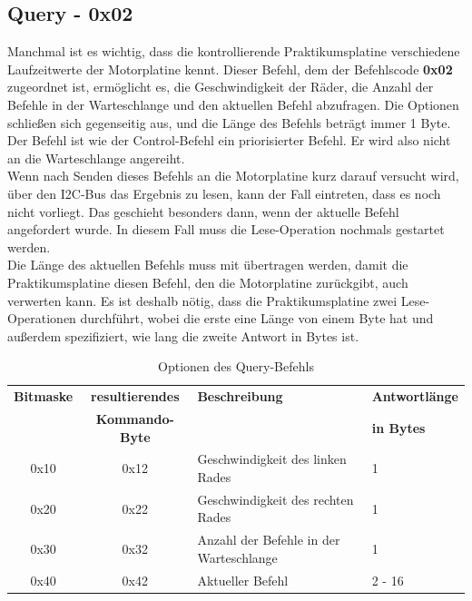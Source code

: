\subsection{Query - 0x02}
Manchmal ist es wichtig, dass die kontrollierende Praktikumsplatine verschiedene Laufzeitwerte
der Motorplatine kennt. Dieser Befehl, dem der Befehlscode \textbf{0x02} zugeordnet ist, ermöglicht
es, die Geschwindigkeit der Räder, die Anzahl der Befehle in der Warteschlange und den aktuellen
Befehl abzufragen. Die Optionen schließen sich gegenseitig aus, und die Länge des Befehls beträgt
immer 1 Byte. Der Befehl ist wie der Control-Befehl ein priorisierter Befehl. Er wird also
nicht an die Warteschlange angereiht.\\
Wenn nach Senden dieses Befehls an die Motorplatine kurz darauf versucht wird, über den I2C-Bus
das Ergebnis zu lesen, kann der Fall eintreten, dass es noch nicht vorliegt.
Das geschieht besonders dann, wenn der aktuelle Befehl angefordert wurde.
In diesem Fall muss die Lese-Operation nochmals gestartet werden.\\
Die Länge des aktuellen Befehls muss mit übertragen werden, damit die Praktikumsplatine
diesen Befehl, den die Motorplatine zurückgibt, auch verwerten kann.
Es ist deshalb nötig, dass die Praktikumsplatine zwei Lese-Operationen durchführt,
wobei die erste eine Länge von einem Byte hat und außerdem spezifiziert, wie lang die zweite Antwort in Bytes ist.

\begin{table}[htb]
\begin{center}
	\begin{tabularx}{\linewidth}{|c|c|X|l|}
		\hline
		\textbf{Bitmaske} & \textbf{resultierendes} & \textbf{Beschreibung} & \textbf{Antwortlänge} \\
		                  & \textbf{Kommando-Byte}  &                       & \textbf{in Bytes}\\
		\hline
		\hline
		0x10              & 0x12                    & Geschwindigkeit des linken Rades & 1 \\
		\hline
		0x20              & 0x22                    & Geschwindigkeit des rechten Rades & 1 \\
		\hline
		0x30              & 0x32                    & Anzahl der Befehle in der Warteschlange & 1 \\
		\hline
		0x40              & 0x42                    & Aktueller Befehl & 2 - 16 \\
		\hline
	\end{tabularx}
	\caption{\label{protocol_queue} Optionen des Query-Befehls}
\end{center}
\end{table}

